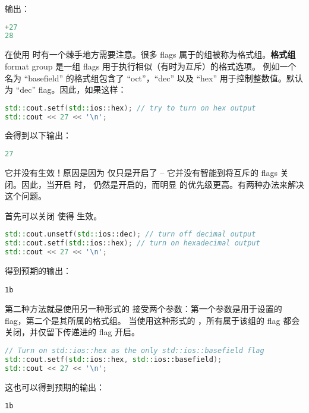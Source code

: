 \documentclass[../../LearnCpp.tex]{subfiles}
\begin{document}
输出：

\begin{lstlisting}[language=C++]
+27
28
\end{lstlisting}

在使用  时有一个棘手地方需要注意。很多 flags 属于的组被称为格式组。\textbf{格式组} format group 是一组 flags 用于执行相似（有时为互斥）的格式选项。
例如一个名为 “basefield” 的格式组包含了 “oct”，“dec” 以及 “hex” 用于控制整数值。默认为 “dec” flag。因此，如果这样：

\begin{lstlisting}[language=C++]
std::cout.setf(std::ios::hex); // try to turn on hex output
std::cout << 27 << '\n';
\end{lstlisting}

会得到以下输出：

\begin{lstlisting}[language=C++]
27
\end{lstlisting}

它并没有生效！原因是因为  仅只是开启了 -- 它并没有智能到将互斥的 flags 关闭。因此，当开启  时，
 仍然是开启的，而明显  的优先级更高。有两种办法来解决这个问题。

首先可以关闭  使得  生效。

\begin{lstlisting}[language=C++]
std::cout.unsetf(std::ios::dec); // turn off decimal output
std::cout.setf(std::ios::hex); // turn on hexadecimal output
std::cout << 27 << '\n';
\end{lstlisting}

得到预期的输出：

\begin{lstlisting}
1b
\end{lstlisting}

第二种方法就是使用另一种形式的  接受两个参数：第一个参数是用于设置的 flag，第二个是其所属的格式组。
当使用这种形式的 ，所有属于该组的 flag 都会关闭，并仅留下传递进的 flag 开启。

\begin{lstlisting}[language=C++]
// Turn on std::ios::hex as the only std::ios::basefield flag
std::cout.setf(std::ios::hex, std::ios::basefield);
std::cout << 27 << '\n';
\end{lstlisting}

这也可以得到预期的输出：

\begin{lstlisting}
1b
\end{lstlisting}
\end{document}
